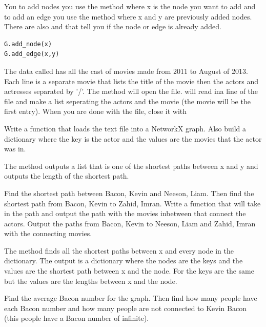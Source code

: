 You to add nodes you use the  method where x is the node you want to add and to add an edge you use the  method where x and y are previously added nodes. There are also  and  that tell you if the node or edge is already added.

\begin{lstlisting}
G.add_node(x)
G.add_edge(x,y)
\end{lstlisting}

The data called  has all the cast of movies made from 2011 to August of 2013. Each line is a separate movie that lists the title of the movie then the actors and actresses separated by '/'. The method  will open the file.  will read ina line of the file and make a list seperating the actors and the movie (the movie will be the first entry). When you are done with the file, close it with

\begin{problem}
Write a function that loads the text file into a NetworkX graph. Also build a dictionary where the key is the actor and the values are the movies that the actor was in.
\end{problem}

The method  outputs a list that is one of the shortest paths between x and y and  outputs the length of the shortest path.

\begin{problem}
Find the shortest path between Bacon, Kevin and Neeson, Liam. Then find the shortest path from Bacon, Kevin to Zahid, Imran. Write a function that will take in the path and output the path with the movies inbetween that connect the actors. Output the paths from Bacon, Kevin to Neeson, Liam and Zahid, Imran with the connecting movies.
\end{problem}

The method  finds all the shortest paths between x and every node in the dictionary. The output is a dictionary where the nodes are the keys and the values are the shortest path between x and the node. For  the keys are the same but the values are the lengths between x and the node.

\begin{problem}
Find the average Bacon number for the graph. Then find how many people have each Bacon number and how many people are not connected to Kevin Bacon (this people have a Bacon number of infinite).
\end{problem}

